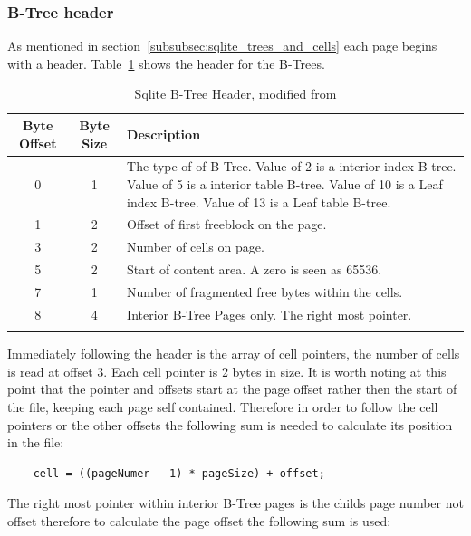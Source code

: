 \subsubsection{B-Tree header}
\label{subsubsec:btree_header}

As mentioned in section~\ref{subsubsec:sqlite_trees_and_cells} each page begins with a header. Table~\ref{tbl:btree_header} shows the header for the B-Trees.

\begin{longtable}[h]{| c | c | p{10cm} |}
		\hline
			\textbf{Byte Offset} & \textbf{Byte Size} & \textbf{Description} \\ 
		\hline
		\endhead
			0 & 1 & The type of of B-Tree. \newline
			Value of 2 is a interior index B-tree. \newline
			Value of 5 is a interior table B-tree. \newline
			Value of 10 is a Leaf index B-tree. \newline
			Value of 13 is a Leaf table B-tree. \\
		\hline
			1 & 2 & Offset of first freeblock on the page. \\
		\hline
			3 & 2 & Number of cells on page. \\
		\hline
			5 & 2 & Start of content area. A zero is seen as 65536. \\
		\hline
			7 & 1 & Number of fragmented free bytes within the cells. \\
		\hline
			8 & 4 & Interior B-Tree Pages only. The right most pointer. \\ 
		\hline
	\caption{Sqlite B-Tree Header, modified from \cite{sqlite}}
	\label{tbl:btree_header}
\end{longtable}

Immediately following the header is the array of cell pointers, the number of cells is read at offset 3. Each cell pointer is 2 bytes in size. It is worth noting at this point that the pointer and offsets start at the page offset rather then the start of the file, keeping each page self contained. Therefore in order to follow the cell pointers or the other offsets the following sum is needed to calculate its position in the file: 

\begin{lstlisting}	
	cell = ((pageNumer - 1) * pageSize) + offset;
\end{lstlisting}

The right most pointer within interior B-Tree pages is the childs page number not offset therefore to calculate the page offset the following sum is used:

